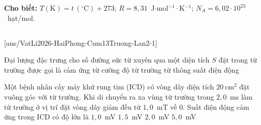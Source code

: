 \def\CheDo{solcolor}%
\def\tenchuong{Cụm 13 trường, Hải Phòng -- Lần 2}
\def\thuonghieu{VẬT LÍ 12 -- Eduzy.com.vn}
\def\TachCauDS{1}
\def\TachCauLG{1}




	\noindent\textbf{Cho biết:} $T(\text{K})=t\,(^\circ\text{C})+273$; $R=8{,}31$~J$\cdot$mol$^{-1}\cdot$K$^{-1}$; $N_A=6{,}02\cdot 10^{23}$~hạt/mol.

	\noindent
	\subsection*{}
	\setcounter{ex}{0}
	[ans/VatLi2026-HaiPhong-Cum13Truong-Lan2-1]

	\begin{ex}%
		Đại lượng đặc trưng cho số đường sức từ xuyên qua một diện tích $S$ đặt trong từ trường được gọi là
		\choice
		{cảm ứng từ}
		{cường độ từ trường}
		{\True từ thông}
		{suất điện động}
	\end{ex}

	\begin{ex}%
		Một bệnh nhân cấy máy khử rung tim (ICD) có vòng dây diện tích $20~\text{cm}^2$ đặt vuông góc với từ trường. Khi di chuyển ra xa vùng từ trường trong $2{,}0$~ms làm từ trường ở vị trí đặt vòng dây giảm đều từ $1{,}0$~mT về $0$. Suất điện động cảm ứng trong ICD có độ lớn là
		\choice
		{\True $1{,}0$~mV}
		{$1{,}5$~mV}
		{$2{,}0$~mV}
		{$5{,}0$~mV}
	\end{ex}

